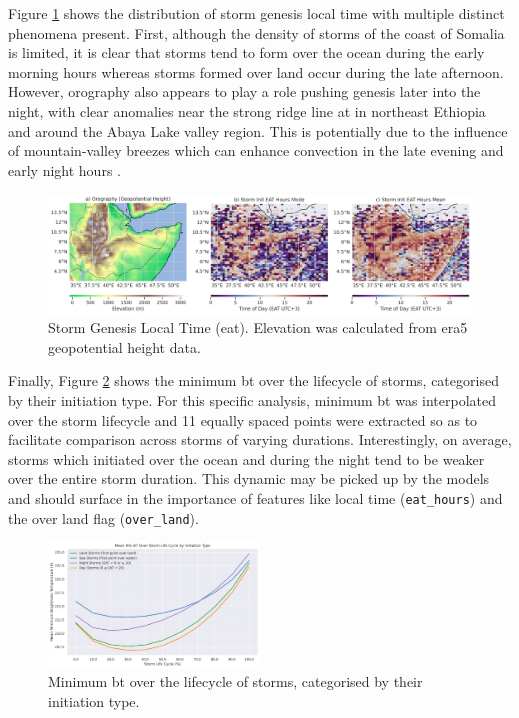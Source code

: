 Figure \ref{fig:orography_storm_init_eat_hours_mode_mean} shows the distribution of storm genesis local time with multiple distinct phenomena present. First, although the density of storms of the coast of Somalia is limited, it is clear that storms tend to form over the ocean during the early morning hours whereas storms formed over land occur during the late afternoon. However, orography also appears to play a role pushing genesis later into the night, with clear anomalies near the strong ridge line at  in northeast Ethiopia and around the Abaya Lake valley region. This is potentially due to the influence of mountain-valley breezes which can enhance convection in the late evening and early night hours \citep{ZardiDinoandWhiteman2013}.

\begin{figure}[ht]
    \centering
    \includegraphics[width=\textwidth]{../figures/generated/exploration/orography_storm_init_eat_hours_mode_mean.png}
    \caption{Storm Genesis Local Time (\acrlong{eat}). Elevation was calculated from \acrshort{era5} geopotential height data.}
    \label{fig:orography_storm_init_eat_hours_mode_mean}
\end{figure}

Finally, Figure \ref{fig:min_bt_over_lifecycle_by_init_type} shows the minimum \acrshort{bt} over the lifecycle of storms, categorised by their initiation type. For this specific analysis, minimum \acrshort{bt} was interpolated over the storm lifecycle and 11 equally spaced points were extracted so as to facilitate comparison across storms of varying durations. Interestingly, on average, storms which initiated over the ocean and during the night tend to be weaker over the entire storm duration. This dynamic may be picked up by the models and should surface in the importance of features like local time (\texttt{eat\_hours}) and the over land flag (\texttt{over\_land}). 

\begin{figure}[ht]
    \centering
    \includegraphics[width=0.5\textwidth]{../figures/generated/exploration/min_bt_over_lifecycle_by_init_type.png}
    \caption{Minimum \acrfull{bt} over the lifecycle of storms, categorised by their initiation type.}
    \label{fig:min_bt_over_lifecycle_by_init_type}
\end{figure}

